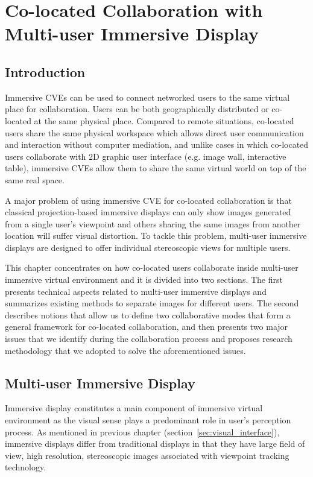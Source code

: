 \chapter{Co-located Collaboration with Multi-user Immersive Display}
\label{chapter:colocated_colab}
\minitoc

\section{Introduction}
Immersive CVEs can be used to connect networked users to the same virtual place for collaboration. Users can be both geographically distributed or co-located at the same physical place. Compared to remote situations, co-located users share the same physical workspace which allows direct user communication and interaction without computer mediation, and unlike cases in which co-located users collaborate with 2D graphic user interface (e.g. image wall, interactive table), immersive CVEs allow them to share the same virtual world on top of the same real space.

A major problem of using immersive CVE for co-located collaboration is that classical projection-based immersive displays can only show images generated from a single user's viewpoint and others sharing the same images from another location will suffer visual distortion. To tackle this problem, multi-user immersive displays are designed to offer individual stereoscopic views for multiple users.

This chapter concentrates on how co-located users collaborate inside multi-user immersive virtual environment and it is divided into two sections. The first presents technical aspects related to multi-user immersive displays and summarizes existing methods to separate images for different users. The second describes notions that allow us to define two collaborative modes that form a general framework for co-located collaboration, and then presents two major issues that we identify during the collaboration process and proposes research methodology that we adopted to solve the aforementioned issues.  


\section{Multi-user Immersive Display}
Immersive display constitutes a main component of immersive virtual environment as the visual sense plays a predominant role in user's perception process. As mentioned in previous chapter (section~\ref{sec:visual_interface}), immersive displays differ from traditional displays in that they have large field of view, high resolution, stereoscopic images associated with viewpoint tracking technology.


